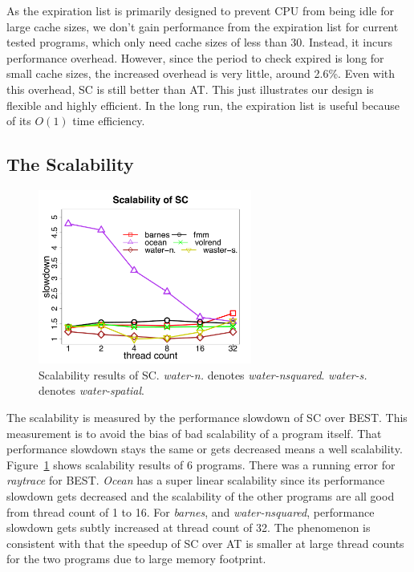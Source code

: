 \documentclass[preprint,nocopyrightspace,10pt]{sigplanconf}
\begin{document}
As the expiration list is primarily designed to prevent CPU from being idle for
large cache sizes, we don't gain performance from the expiration list for current tested programs,
which only need cache sizes of less than 30. Instead, it incurs performance overhead.
However, since the period to check expired is long for small cache sizes, the increased 
overhead is very little, around 2.6\%. Even with this overhead, SC is still better than AT. 
This just illustrates our design is flexible and highly efficient. In the long run, the expiration
list is useful because of its $O(1)$ time efficiency.

\subsection{The Scalability}
\label{eval:sca}

\begin{figure}[hbpt]
\centering
\includegraphics[width=7cm]{figures/scalability.pdf}
\caption{Scalability results of SC. \emph{water-n.} denotes \emph{water-nsquared}.
 \emph{water-s.} denotes \emph{water-spatial}. }
\label{fig:scala}
\end{figure}

The scalability is measured by the performance slowdown of SC over BEST.
This measurement is to avoid the bias of bad scalability of a program itself.
That performance slowdown stays the same or gets decreased means a well
scalability. Figure~\ref{fig:scala} shows scalability results of 6 programs. There
was a running error for \emph{raytrace} for BEST. \emph{Ocean} has a super
linear scalability since its performance slowdown gets decreased and the scalability of the
other programs are all good from thread count of 1 to 16. For \emph{barnes},
and \emph{water-nsquared}, performance slowdown gets subtly increased at thread count
of 32. The phenomenon is consistent with that the speedup of SC over AT is smaller at
large thread counts for the two programs due to large memory footprint.
\end{document}
